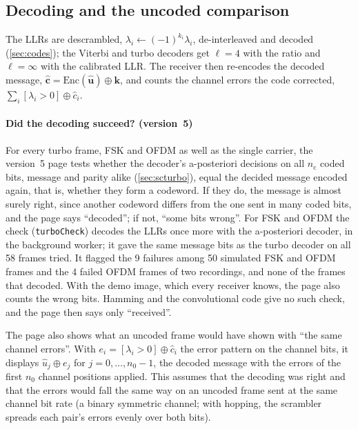 \documentclass[11pt,a4paper]{article}
\newcommand{\code}[1]{\texttt{#1}}
\newcommand{\nc}{n_{\mathrm{c}}}
\newcommand{\nz}{n_{0}}
\theoremstyle{remark}
\begin{document}
\subsection{Decoding and the uncoded comparison}
\label{sec:decode}
The LLRs are descrambled, $\lambda_i \leftarrow (-1)^{k_i}\lambda_i$, de-interleaved and decoded (\cref{sec:codes}); the Viterbi and turbo decoders get $\ell = 4$ with the ratio and $\ell = \infty$ with the calibrated LLR. The receiver then re-encodes the decoded message, $\hat{\bm c} = \mathrm{Enc}(\hat{\bm u}) \oplus \bm k$, and counts the channel errors the code corrected, $\sum_i [\lambda_i > 0] \oplus \hat c_i$.

\paragraph{Did the decoding succeed? (version~5)}
For every turbo frame, FSK and OFDM as well as the single carrier, the version~5 page tests whether the decoder's a-posteriori decisions on all $\nc$ coded bits, message and parity alike (\cref{sec:scturbo}), equal the decided message encoded again, that is, whether they form a codeword. If they do, the message is almost surely right, since another codeword differs from the one sent in many coded bits, and the page says ``decoded''; if not, ``some bits wrong''. For FSK and OFDM the check (\code{turboCheck}) decodes the LLRs once more with the a-posteriori decoder, in the background worker; it gave the same message bits as the turbo decoder on all 58 frames tried. It flagged the 9 failures among 50 simulated FSK and OFDM frames and the 4 failed OFDM frames of two recordings, and none of the frames that decoded. With the demo image, which every receiver knows, the page also counts the wrong bits. Hamming and the convolutional code give no such check, and the page then says only ``received''.

The page also shows what an uncoded frame would have shown with ``the same channel errors''. With $e_i = [\lambda_i > 0] \oplus \hat c_i$ the error pattern on the channel bits, it displays $\hat u_j \oplus e_j$ for $j = 0, \dots, \nz - 1$, the decoded message with the errors of the first $\nz$ channel positions applied. This assumes that the decoding was right and that the errors would fall the same way on an uncoded frame sent at the same channel bit rate (a binary symmetric channel; with hopping, the scrambler spreads each pair's errors evenly over both bits).
\end{document}

